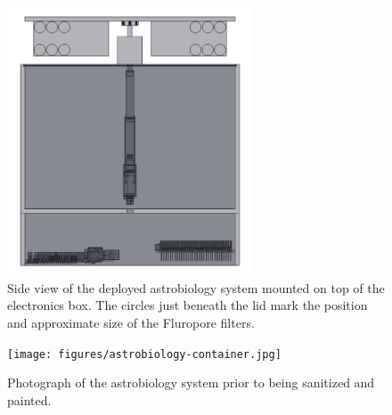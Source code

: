 \begin{figure}[h!]
	\begin{center}
	\includegraphics[width=0.65\textwidth]{figures/astrobio-electronics-deployed-transparent-sideview.png}
	\caption{Side view of the deployed astrobiology system mounted on top of the electronics box. The circles just beneath the lid mark the position and approximate size of the Fluropore filters.}
	\label{fig:astrobiology-system}
	\end{center}
\end{figure}

\begin{figure}[h!]
	\begin{center}
	\texttt{[image: figures/astrobiology-container.jpg]}
	\caption{Photograph of the astrobiology system prior to being sanitized and painted.}
	\label{fig:astrobiology-real}
	\end{center}
\end{figure}


